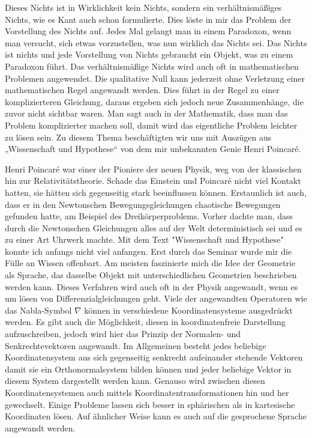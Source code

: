 \documentclass[DIN,
	fontsize=12pt,
a4paper]{scrartcl}
\begin{document}
Dieses Nichts ist in Wirklichkeit kein Nichts, sondern ein verhältnismäßiges Nichts, wie es Kant auch schon formulierte.
Dies löste in mir das Problem der Vorstellung des Nichts auf.
Jedes Mal gelangt man in einem Paradoxon, wenn man versucht, sich etwas vorzustellen, was nun wirklich das Nichts sei.
Das Nichts ist nichts und jede Vorstellung von Nichts gebraucht ein Objekt, was zu einem Paradoxon führt.
Das verhältnismäßige Nichts wird auch oft in mathematischen Problemen angewendet. Die qualitative Null kann jederzeit ohne Verletzung einer mathematischen Regel angewandt werden.
Dies führt in der Regel zu einer komplizierteren Gleichung, daraus ergeben sich jedoch neue Zusammenhänge, die zuvor nicht sichtbar waren.
Man sagt auch in der Mathematik, dass man das Problem komplizierter machen soll, damit wird das eigentliche Problem leichter zu lösen sein.
Zu diesem Thema beschäftigten wir uns mit Auszügen aus „Wissenschaft und Hypothese“ von dem mir unbekannten Genie Henri Poincaré.

Henri Poincaré war einer der Pioniere der neuen Physik, weg von der klassischen hin zur Relativitätstheorie.
Schade das Einstein und Poincaré nicht viel Kontakt hatten, sie hätten sich gegenseitig stark beeinflussen können.
Erstaunlich ist auch, dass er in den Newtonschen Bewegungsgleichungen chaotische Bewegungen gefunden hatte, am Beispiel des Dreikörperproblems.
Vorher dachte man, dass durch die Newtonschen Gleichungen alles auf der Welt deterministisch sei und es zu einer Art Uhrwerk machte.
Mit dem Text "Wissenschaft und Hypothese" konnte ich anfangs nicht viel anfangen. Erst durch das Seminar wurde mir die Fülle an Wissen offenbart.
Am meisten faszinierte mich die Idee der Geometrie als Sprache, das dasselbe Objekt mit unterschiedlichen Geometrien beschrieben werden kann.
Dieses Verfahren wird auch oft in der Physik angewandt, wenn es um lösen von Differenzialgleichungen geht.
Viele der angewandten Operatoren wie das Nabla-Symbol $\nabla$ können in verschiedene Koordinatensysteme ausgedrückt werden.
Es gibt auch die Möglichkeit, diesen in koordinatenfreie Darstellung aufzuschreiben, jedoch wird hier das Prinzip der Normalen- und Senkrechtevektoren angewandt.
Im Allgemeinen besteht jedes beliebige Koordinatensystem aus sich gegenseitig senkrecht aufeinander stehende Vektoren damit sie ein Orthonormalsystem bilden können und jeder beliebige Vektor in diesem System dargestellt werden kann.
Genauso wird zwischen diesen Koordinatensystemen auch mittels Koordinatentransformationen hin und her gewechselt.
Einige Probleme lassen sich besser in sphärischen als in kartesische Koordinaten lösen.
Auf ähnlicher Weise kann es auch auf die gesprochene Sprache angewandt werden.
\end{document}
